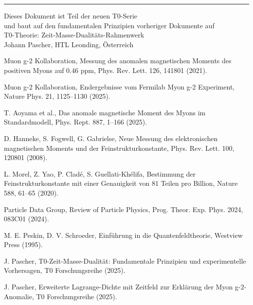 \documentclass[12pt,a4paper]{article}
\begin{document}
	\begin{center}
		\hrule
		\vspace{0.5cm}
		Dieses Dokument ist Teil der neuen T0-Serie\\
		und baut auf den fundamentalen Prinzipien vorheriger Dokumente auf\\
		\vspace{0.3cm}
		T0-Theorie: Zeit-Masse-Dualitäts-Rahmenwerk\\
		Johann Pascher, HTL Leonding, Österreich\\
	\end{center}
	
	\begin{thebibliography}{9}
		Muon g-2 Kollaboration, 
		Messung des anomalen magnetischen Moments des positiven Myons auf 0.46 ppm,
		Phys. Rev. Lett. 126, 141801 (2021).
		
		Muon g-2 Kollaboration,
		Endergebnisse vom Fermilab Myon g-2 Experiment,
		Nature Phys. 21, 1125–1130 (2025).
		
		T. Aoyama et al.,
		Das anomale magnetische Moment des Myons im Standardmodell,
		Phys. Rept. 887, 1–166 (2025).
		
		D. Hanneke, S. Fogwell, G. Gabrielse,
		Neue Messung des elektronischen magnetischen Moments und der Feinstrukturkonstante,
		Phys. Rev. Lett. 100, 120801 (2008).
		
		L. Morel, Z. Yao, P. Cladé, S. Guellati-Khélifa,
		Bestimmung der Feinstrukturkonstante mit einer Genauigkeit von 81 Teilen pro Billion,
		Nature 588, 61–65 (2020).
		
		Particle Data Group,
		Review of Particle Physics,
		Prog. Theor. Exp. Phys. 2024, 083C01 (2024).
		
		M. E. Peskin, D. V. Schroeder,
		Einführung in die Quantenfeldtheorie,
		Westview Press (1995).
		
		J. Pascher,
		T0-Zeit-Masse-Dualität: Fundamentale Prinzipien und experimentelle Vorhersagen,
		T0 Forschungsreihe (2025).
		
		J. Pascher,
		Erweiterte Lagrange-Dichte mit Zeitfeld zur Erklärung der Myon g-2-Anomalie,
		T0 Forschungsreihe (2025).
	\end{thebibliography}
	
\end{document}
